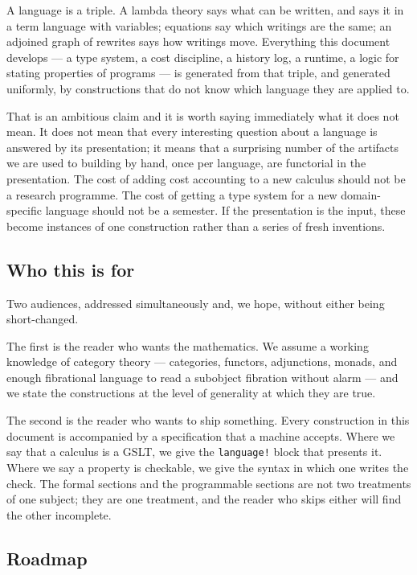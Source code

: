 \documentclass[11pt]{article}
\theoremstyle{definition}
\theoremstyle{plain}
\theoremstyle{remark}
\begin{document}
A language is a triple. A lambda theory says what can be written, and says it in a term
language with variables; equations say which writings are the same; an adjoined graph of
rewrites says how writings move. Everything this document
develops --- a type system, a cost discipline, a history log, a runtime, a logic for
stating properties of programs --- is generated from that triple, and generated
uniformly, by constructions that do not know which language they are applied to.

That is an ambitious claim and it is worth saying immediately what it does not mean. It
does not mean that every interesting question about a language is answered by its
presentation; it means that a surprising number of the artifacts we are used to
building by hand, once per language, are functorial in the presentation. The cost of
adding cost accounting to a new calculus should not be a research programme. The cost
of getting a type system for a new domain-specific language should not be a semester.
If the presentation is the input, these become instances of one construction rather
than a series of fresh inventions.

\subsection{Who this is for}

Two audiences, addressed simultaneously and, we hope, without either being short-changed.

The first is the reader who wants the mathematics. We assume a working knowledge of
category theory --- categories, functors, adjunctions, monads, and enough fibrational
language to read a subobject fibration without alarm --- and we state the constructions
at the level of generality at which they are true.

The second is the reader who wants to ship something. Every construction in this
document is accompanied by a specification that a machine accepts. Where we say that a
calculus is a GSLT, we give the \texttt{language!} block that presents it. Where we say
a property is checkable, we give the syntax in which one writes the check. The formal
sections and the programmable sections are not two treatments of one subject; they are
one treatment, and the reader who skips either will find the other incomplete.

\subsection{Roadmap}
\end{document}
